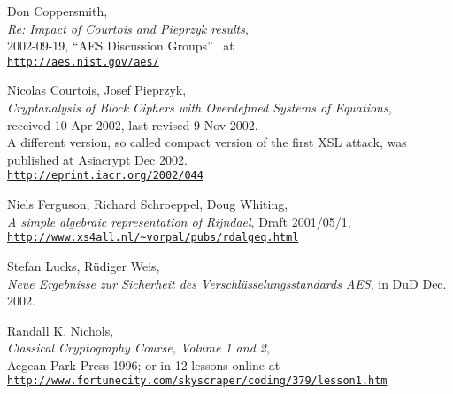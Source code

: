 \newpage
\begin{thebibliography}{99999}

  
        Don Coppersmith, \\
        {\em Re: Impact of Courtois and Pieprzyk results}, \\
        2002-09-19, ``AES Discussion Groups''~ at \\
        \href{http://aes.nist.gov/aes/}
        {\texttt{http://aes.nist.gov/aes/}}

  
        Nicolas Courtois, Josef Pieprzyk, \\
        {\em Cryptanalysis of Block Ciphers with Overdefined Systems
             of Equations}, \\
        received 10 Apr 2002, last revised 9 Nov 2002.\\
        A different version, so called compact version of the first XSL attack,
        was published at Asiacrypt Dec 2002. \\
        \href{http://eprint.iacr.org/2002/044}
        {\texttt{http://eprint.iacr.org/2002/044}}

  
        Niels Ferguson, Richard Schroeppel, Doug Whiting, \\
        {\em A simple algebraic representation of Rijndael}, 
        Draft 2001/05/1, \\
        \href{http://www.xs4all.nl/~vorpal/pubs/rdalgeq.html}
        {\texttt{http://www.xs4all.nl/\~{}vorpal/pubs/rdalgeq.html}}

  
        Stefan Lucks, R\"udiger Weis, \\
        {\em Neue Ergebnisse zur Sicherheit des Verschl\"usselungsstandards
             AES}, 
        in DuD Dec. 2002.

  
       Randall K. Nichols, \\
       {\em Classical Cryptography Course, Volume 1 and 2}, \\
       Aegean Park Press 1996;
       or in 12 lessons online at \\
       \href{http://www.fortunecity.com/skyscraper/coding/379/lesson1.htm}
       {\texttt{http://www.fortunecity.com/skyscraper/coding/379/lesson1.htm}}


\end{thebibliography}
